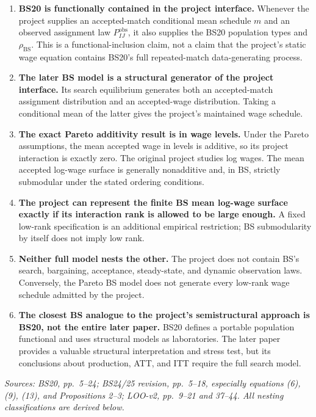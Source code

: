 \documentclass[11pt]{article}
\begin{document}
\begin{enumerate}
\item \textbf{BS20 is functionally contained in the project interface.}
  Whenever the project supplies an accepted-match conditional mean schedule
  \(m\) and an observed assignment law \(P^{\mathrm{obs}}_{IJ}\), it also
  supplies the BS20 population types and
  \(\rho_{\mathrm{BS}}\).  This is a functional-inclusion claim, not a claim
  that the project's static wage equation contains BS20's full repeated-match
  data-generating process.
\item \textbf{The later BS model is a structural generator of the project
  interface.}  Its search equilibrium generates both an accepted-match
  assignment distribution and an accepted-wage distribution.  Taking a
  conditional mean of the latter gives the project's maintained wage
  schedule.
\item \textbf{The exact Pareto additivity result is in wage levels.}
  Under the Pareto assumptions, the mean accepted wage in levels is additive,
  so its project interaction is exactly zero.  The original project studies
  log wages.  The mean accepted log-wage surface is generally nonadditive
  and, in BS, strictly submodular under the stated ordering conditions.
\item \textbf{The project can represent the finite BS mean log-wage surface
  exactly if its interaction rank is allowed to be large enough.}  A fixed
  low-rank specification is an additional empirical restriction; BS
  submodularity by itself does not imply low rank.
\item \textbf{Neither full model nests the other.}  The project does not
  contain BS's search, bargaining, acceptance, steady-state, and dynamic
  observation laws.  Conversely, the Pareto BS model does not generate every
  low-rank wage schedule admitted by the project.
\item \textbf{The closest BS analogue to the project's semistructural
  approach is BS20, not the entire later paper.}  BS20 defines a portable
  population functional and uses structural models as laboratories.  The
  later paper provides a valuable structural interpretation and stress test,
  but its conclusions about production, ATT, and ITT require the full search
  model.
\end{enumerate}

\textit{Sources: BS20, pp.\ 5--24; BS24/25 revision, pp.\ 5--18,
especially equations (6), (9), (13), and Propositions 2--3; LOO-v2,
pp.\ 9--21 and 37--44.  All nesting classifications are derived below.}
\end{document}
